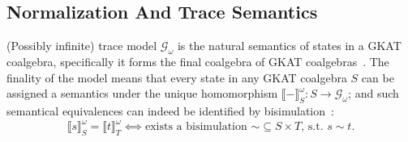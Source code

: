 \documentclass{extarticle}
\newtheorem{lemma}[theorem]{Lemma}
\begin{document}


\subsection{Normalization And Trace Semantics}

(Possibly infinite) trace model \(𝒢_ω\) is the natural semantics of states in a GKAT coalgebra, specifically it forms the final coalgebra of GKAT coalgebras~\cite{schmid_GuardedKleeneAlgebra_2021}.
The finality of the model means that every state in any GKAT coalgebra \(S\) can be assigned a semantics under the unique homomorphism \(⟦-⟧^{ω}_{S}: S → 𝒢_ω\); and such semantical equivalences can indeed be identified by bisimulation~\cite{schmid_GuardedKleeneAlgebra_2021}:
\[⟦s⟧^{ω}_{S} = ⟦t⟧^{ω}_{T} ⟺ \text{exists a bisimulation \({∼} ⊆ S × T\), s.t. \(s ∼ t\)}.\]
\end{document}
